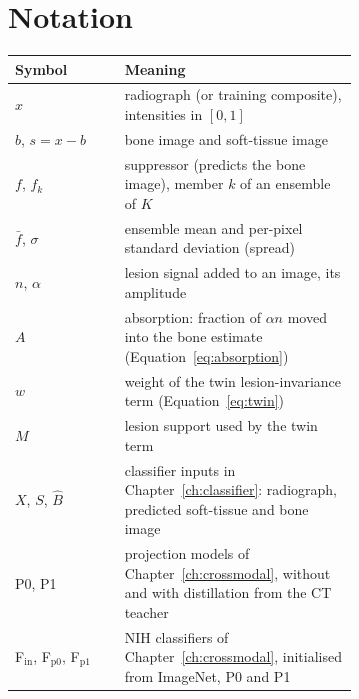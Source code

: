 \section{Notation}
\begin{center}
\begin{tabular}{@{}lp{0.68\linewidth}@{}}
\toprule
Symbol & Meaning \\
\midrule
$x$ & radiograph (or training composite), intensities in $[0,1]$ \\
$b$, $s=x-b$ & bone image and soft-tissue image \\
$f$, $f_k$ & suppressor (predicts the bone image), member $k$ of an ensemble of $K$ \\
$\bar f$, $\sigma$ & ensemble mean and per-pixel standard deviation (spread) \\
$n$, $\alpha$ & lesion signal added to an image, its amplitude \\
$A$ & absorption: fraction of $\alpha n$ moved into the bone estimate (Equation~\ref{eq:absorption}) \\
$w$ & weight of the twin lesion-invariance term (Equation~\ref{eq:twin}) \\
$M$ & lesion support used by the twin term \\
$X$, $S$, $\hat B$ & classifier inputs in Chapter~\ref{ch:classifier}: radiograph, predicted soft-tissue and bone image \\
P0, P1 & projection models of Chapter~\ref{ch:crossmodal}, without and with distillation from the CT teacher \\
F$_\mathrm{in}$, F$_\mathrm{p0}$, F$_\mathrm{p1}$ & NIH classifiers of Chapter~\ref{ch:crossmodal}, initialised from ImageNet, P0 and P1 \\
\bottomrule
\end{tabular}
\end{center}
